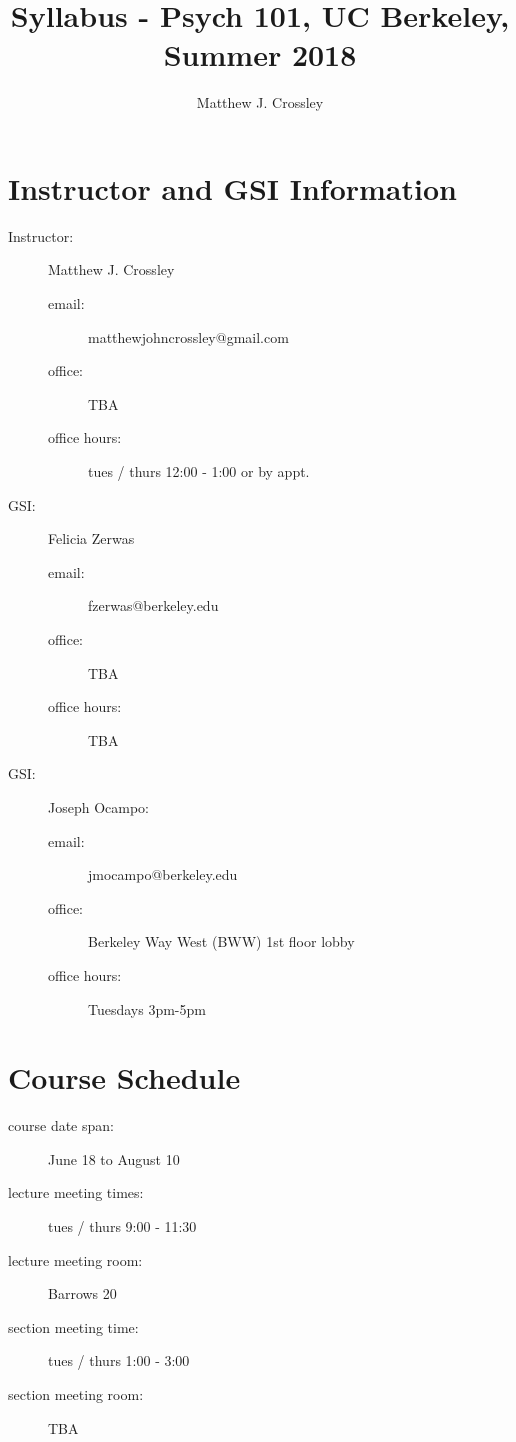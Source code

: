 \documentclass{article}
\begin{document}
\title{Syllabus - Psych 101, UC Berkeley, Summer 2018}
\author{Matthew J. Crossley}
\maketitle

\section{Instructor and GSI Information}
\begin{description}
\item [Instructor:] Matthew J. Crossley
  \begin{description}
  \item [email:] matthewjohncrossley@gmail.com
  \item [office:] TBA
  \item [office hours:] tues / thurs 12:00 - 1:00 or by appt.
  \end{description}

\item [GSI:] Felicia Zerwas
  \begin{description}
  \item [email:] fzerwas@berkeley.edu
  \item [office:] TBA
  \item [office hours:] TBA
  \end{description}

\item [GSI:] Joseph Ocampo:
    \begin{description}
  \item [email:] jmocampo@berkeley.edu
  \item [office:] Berkeley Way West (BWW) 1st floor lobby
  \item [office hours:] Tuesdays 3pm-5pm
  \end{description}
\end{description}

\section{Course Schedule}
\begin{description}
\item [course date span:] June 18 to August 10
\item [lecture meeting times:] tues / thurs 9:00 - 11:30
\item [lecture meeting room:] Barrows 20
\item [section meeting time:] tues / thurs 1:00 - 3:00
\item [section meeting room:] TBA
\end{description}
\end{document}
